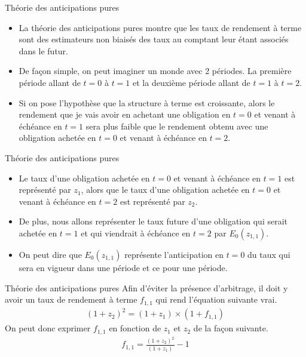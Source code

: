 \documentclass{beamer}
\begin{document}
\begin{frame}{Théorie des anticipations pures}
\begin{itemize}
\item La théorie des anticipations pures montre que les taux de rendement à terme sont des estimateurs non biaisés des taux au comptant leur étant associés dans le futur. 
\item De façon simple, on peut imaginer un monde avec 2 périodes. La première période allant de $t=0$ à $t=1$ et la deuxième période allant de $t=1$ à $t=2$.
\item Si on pose l'hypothèse que la structure à terme est croissante,  alors le rendement que je vais avoir en achetant une obligation en $t=0$ et venant à échéance en $t=1$ sera plus faible que le rendement obtenu avec une obligation achetée en $t=0$ et venant à échéance en $t=2$.  
\end{itemize}
\end{frame}


\begin{frame}{Théorie des anticipations pures}
\begin{itemize}
\item Le taux d'une obligation achetée en $t=0$ et venant à échéance en $t=1$ est représenté par $z_{1}$,  alors que le taux d'une obligation achetée en $t=0$ et venant à échéance en $t=2$ est représenté par $z_{2}$. 
\item De plus, nous allons représenter le taux future d'une obligation qui serait achetée en $t=1$ et qui viendrait à échéance en $t=2$ par $E_0(z_{1,1})$.  
\item On peut dire que $E_0(z_{1,1})$ représente l'anticipation en $t=0$ du taux qui sera en vigueur dans une période et ce pour une période. 
\end{itemize}
\end{frame}



\begin{frame}{Théorie des anticipations pures}
Afin d'éviter la présence d'arbitrage, il doit y avoir un taux de rendement à terme $f_{1,1}$ qui rend l'équation suivante vrai.
\begin{align*}
(1+z_2)^2=(1+z_1) \times (1+f_{1,1})
\end{align*}
On peut donc exprimer $f_{1,1}$ en fonction de $z_1$ et $z_2$ de la façon suivante.
\begin{align*}
f_{1,1}=\frac{(1+z_2)^2}{(1+z_1)}-1
\end{align*}
\end{frame}
\end{document}
